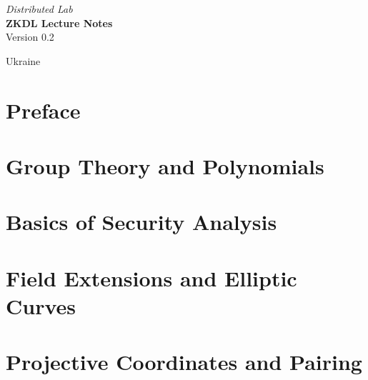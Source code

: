 \documentclass{zkdl-template-105x135-nohead}
\def\maketitle{
    \begin{center}
        \vspace{5mm}
        {\Large\sffamily \emph{Distributed Lab}} \\ \vspace{30mm}
        {\huge\sffamily\bfseries ZKDL Lecture Notes} \\ \vspace{5mm}
        {Version 0.2} \\ \vspace{10mm}
    \end{center}
    
    \vfill

    \begin{center}
        {Ukraine} \\ \vspace{2mm}
        {\sffamily \the\year}
    \end{center}

    \thispagestyle{empty}
    \pagebreak
}
\begin{document}
    \maketitle

    \pagecolor{white}
    
    \vspace*{\fill}

    \begin{abstract}
        \fontsize{7}{8}\selectfont
        
    \end{abstract}
    
    \vspace*{\fill}
    
    \thispagestyle{empty}
    \newpage

    \pagestyle{fancy}
    \pagecolor{white}

    \tableofcontents

    \pagebreak


    \section*{Preface}

    

    \section{Group Theory and Polynomials} \label{section:math-crypto-1}

    

    \section{Basics of Security Analysis}\label{section:math-crypto-2}

    

    \section{Field Extensions and Elliptic Curves}

    \label{section:field_extensions}

    \section{Projective Coordinates and Pairing}
\end{document}
